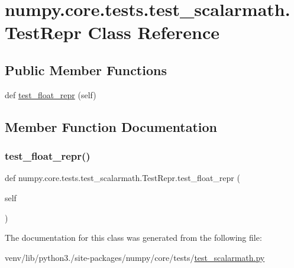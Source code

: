 \hypertarget{classnumpy_1_1core_1_1tests_1_1test__scalarmath_1_1TestRepr}{}\section{numpy.\+core.\+tests.\+test\+\_\+scalarmath.\+Test\+Repr Class Reference}
\label{classnumpy_1_1core_1_1tests_1_1test__scalarmath_1_1TestRepr}
\subsection*{Public Member Functions}
\begin{DoxyCompactItemize}
\item 
def \hyperlink{classnumpy_1_1core_1_1tests_1_1test__scalarmath_1_1TestRepr_a3d0b5f77e368a6fab5275a0c9e20882e}{test\+\_\+float\+\_\+repr} (self)
\end{DoxyCompactItemize}


\subsection{Member Function Documentation}
\mbox{\label{classnumpy_1_1core_1_1tests_1_1test__scalarmath_1_1TestRepr_a3d0b5f77e368a6fab5275a0c9e20882e}} 
\subsubsection{\texorpdfstring{test\+\_\+float\+\_\+repr()}{test\_float\_repr()}}
{\footnotesize\ttfamily def numpy.\+core.\+tests.\+test\+\_\+scalarmath.\+Test\+Repr.\+test\+\_\+float\+\_\+repr (\begin{DoxyParamCaption}\item[{}]{self }\end{DoxyParamCaption})}



The documentation for this class was generated from the following file\+:\begin{DoxyCompactItemize}
\item 
venv/lib/python3./site-\/packages/numpy/core/tests/\hyperlink{test__scalarmath_8py}{test\+\_\+scalarmath.\+py}\end{DoxyCompactItemize}

